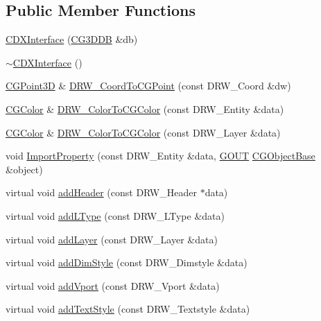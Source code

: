 \subsection*{Public Member Functions}
\begin{DoxyCompactItemize}
\item 
\hyperlink{class_c_d_x_interface_ab8d0c36dee7b9de491f7ce5415057e72}{C\+D\+X\+Interface} (\hyperlink{class_c_g3_d_d_b}{C\+G3\+D\+D\+B} \&db)
\item 
\hyperlink{class_c_d_x_interface_a66b110378b4a476b4fae4e45cc4bc79b}{$\sim$\+C\+D\+X\+Interface} ()
\item 
\hyperlink{class_c_g_point3_d}{C\+G\+Point3\+D} \& \hyperlink{class_c_d_x_interface_aa82bb08110b3a7eea58683f64dc846c7}{D\+R\+W\+\_\+\+Coord\+To\+C\+G\+Point} (const D\+R\+W\+\_\+\+Coord \&dw)
\item 
\hyperlink{class_c_g_color}{C\+G\+Color} \& \hyperlink{class_c_d_x_interface_a3f14b0218fe047e5c59058046106e3c0}{D\+R\+W\+\_\+\+Color\+To\+C\+G\+Color} (const D\+R\+W\+\_\+\+Entity \&data)
\item 
\hyperlink{class_c_g_color}{C\+G\+Color} \& \hyperlink{class_c_d_x_interface_a4ef7455adad7e37360185755635b1313}{D\+R\+W\+\_\+\+Color\+To\+C\+G\+Color} (const D\+R\+W\+\_\+\+Layer \&data)
\item 
void \hyperlink{class_c_d_x_interface_a11926c380750fcf446546588c588ce63}{Import\+Property} (const D\+R\+W\+\_\+\+Entity \&data, \hyperlink{_g_types_8h_a0858ec221262e635612871d70ca233ad}{G\+O\+U\+T} \hyperlink{class_c_g_object_base}{C\+G\+Object\+Base} \&object)
\item 
virtual void \hyperlink{class_c_d_x_interface_acf9bea6846324c3821d0157237e076c9}{add\+Header} (const D\+R\+W\+\_\+\+Header $\ast$data)
\item 
virtual void \hyperlink{class_c_d_x_interface_aad4f9e90fdaefc68f02b09e6489b7e5b}{add\+L\+Type} (const D\+R\+W\+\_\+\+L\+Type \&data)
\item 
virtual void \hyperlink{class_c_d_x_interface_a2f942ab984e133d62f9bf0033ffdab5a}{add\+Layer} (const D\+R\+W\+\_\+\+Layer \&data)
\item 
virtual void \hyperlink{class_c_d_x_interface_ac663225034f9d025a0d2a9f558960f96}{add\+Dim\+Style} (const D\+R\+W\+\_\+\+Dimstyle \&data)
\item 
virtual void \hyperlink{class_c_d_x_interface_a29b6190c5e6ebc25867c7b3b5e58cc21}{add\+Vport} (const D\+R\+W\+\_\+\+Vport \&data)
\item 
virtual void \hyperlink{class_c_d_x_interface_a47293ad5192906005ba5a18dcaa71ddd}{add\+Text\+Style} (const D\+R\+W\+\_\+\+Textstyle \&data)

\end{DoxyCompactItemize}
